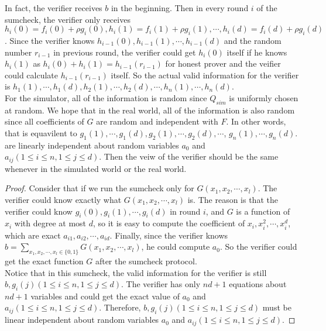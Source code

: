 In fact, the verifier receives $b$ in the beginning. Then in every round $i$ of the sumcheck, the verifier only receives $h_i(0) = f_i(0) + \rho g_i(0), h_i(1) = f_i(1) + \rho g_i(1), \cdots, h_i(d) = f_i(d) + \rho g_i(d)$. Since the verifier knows $h_{i-1}(0), h_{i-1}(1), \cdots, h_{i-1}(d)$ and the random number $r_{i-1}$ in previous round, the verifier could get $h_{i}(0)$ itself if he knows $h_{i}(1)$ as $h_{i}(0) + h_i(1) = h_{i-1}(r_{i-1})$ for honest prover and the veifier could calculate $h_{i-1}(r_{i-1})$ itself. So the actual valid information for the verifier is $h_{1}(1), \cdots, h_{1}(d), h_{2}(1), \cdots, h_2(d), \cdots, h_{n}(1), \cdots, h_{n}(d)$. \\

For the simulator, all of the information is random since $Q_{sim}$ is uniformly chosen at random. We hope that in the real world, all of the information is also random since all coefficients of $G$ are random and independent with $F$. In other words, that is equavilent to $g_{1}(1), \cdots, g_{1}(d), g_{2}(1), \cdots, g_2(d), \cdots$, $g_{n}(1), \cdots, g_{n}(d)$. are linearly independent about random variables $a_0$ and $a_{ij}(1 \leq i \leq n, 1 \leq j \leq d)$. Then the veiw of the verifier should be the same whenever in the simulated world or the real world. 

\begin{proof}
Consider that if we run the sumcheck only for $G(x_1, x_2, \cdots, x_l)$. The verifier could know exactly what $G(x_1, x_2, \cdots, x_l)$ is. The reason is that the verifier could know $g_{i}(0), g_{i}(1), \cdots, g_{i}(d)$ in round $i$, and $G$ is a function of $x_i$ with degree at most $d$, so it is easy to compute the coefficient of $x_i, x^2_i, \cdots, x^d_i$, which are exact $a_{i1}, a_{i2}, \cdots, a_{id}$. Finally, since the verifier knows $b = \sum\limits_{x_1, x_2, \cdots, x_l \in \{0, 1\}}G(x_1, x_2, \cdots, x_l)$, he could compute $a_0$. So the verifier could get the exact function $G$ after the sumcheck protocol.\\  

Notice that in this sumcheck, the valid information for the verifier is still $b, g_i(j)(1 \leq i \leq n, 1 \leq j \leq d)$. The verifier has only $nd + 1$ equations about $nd + 1$ variables and could get the exact value of $a_0$ and $a_{ij}(1 \leq i \leq n, 1 \leq j \leq d)$. Therefore, $b, g_i(j)(1 \leq i \leq n, 1 \leq j \leq d)$ must be linear independent about random variables $a_0$ and $a_{ij}(1 \leq i \leq n, 1 \leq j \leq d)$.
\end{proof}

